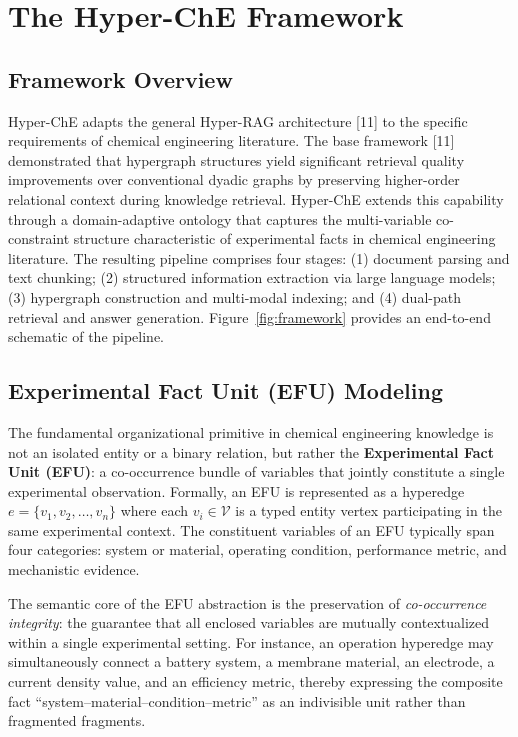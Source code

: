 \documentclass[11pt,a4paper]{article}
\begin{document}

\section{The Hyper-ChE Framework}
\label{sec:framework}

\subsection{Framework Overview}
\label{subsec:overview}

Hyper-ChE adapts the general Hyper-RAG architecture [11] to the specific requirements of chemical engineering literature. The base framework [11] demonstrated that hypergraph structures yield significant retrieval quality improvements over conventional dyadic graphs by preserving higher-order relational context during knowledge retrieval. Hyper-ChE extends this capability through a domain-adaptive ontology that captures the multi-variable co-constraint structure characteristic of experimental facts in chemical engineering literature. The resulting pipeline comprises four stages: (1) document parsing and text chunking; (2) structured information extraction via large language models; (3) hypergraph construction and multi-modal indexing; and (4) dual-path retrieval and answer generation. Figure~\ref{fig:framework} provides an end-to-end schematic of the pipeline.

\subsection{Experimental Fact Unit (EFU) Modeling}
\label{subsec:efu}

The fundamental organizational primitive in chemical engineering knowledge is not an isolated entity or a binary relation, but rather the \textbf{Experimental Fact Unit (EFU)}: a co-occurrence bundle of variables that jointly constitute a single experimental observation. Formally, an EFU is represented as a hyperedge $e = \{v_1, v_2, \ldots, v_n\}$ where each $v_i \in \mathcal{V}$ is a typed entity vertex participating in the same experimental context. The constituent variables of an EFU typically span four categories: system or material, operating condition, performance metric, and mechanistic evidence.

The semantic core of the EFU abstraction is the preservation of \emph{co-occurrence integrity}: the guarantee that all enclosed variables are mutually contextualized within a single experimental setting. For instance, an operation hyperedge may simultaneously connect a battery system, a membrane material, an electrode, a current density value, and an efficiency metric, thereby expressing the composite fact ``system--material--condition--metric'' as an indivisible unit rather than fragmented fragments.
\end{document}
